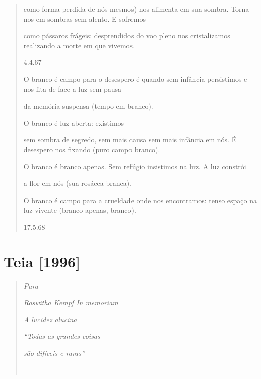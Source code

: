 \begin{quote}
como forma perdida de nós mesmos) nos alimenta em sua sombra. Torna-nos
em sombras sem alento. E sofremos

como pássaros frágeis: desprendidos do voo pleno nos cristalizamos
realizando a morte em que vivemos.

4.4.67

O branco é campo para o desespero é quando sem infância persistimos e
nos fita de face a luz sem pausa

da memória suspensa (tempo em branco).

O branco é luz aberta: existimos

sem sombra de segredo, sem mais causa sem mais infância em nós. É
desespero nos fixando (puro campo branco).

O branco é branco apenas. Sem refúgio insistimos na luz. A luz constrói

a flor em nós (sua rosácea branca).

O branco é campo para a crueldade onde nos encontramos: tenso espaço na
luz vivente (branco apenas, branco).

17.5.68
\end{quote}

\section{Teia {[}1996{]}}\label{teia}

\begin{quote}
\emph{Para}

\emph{Roswitha Kempf In memoriam}

\emph{A lucidez alucina}

\emph{``Todas as grandes coisas}

\emph{são difíceis e raras''}


\end{quote}

\subsection{}\label{section-9}

